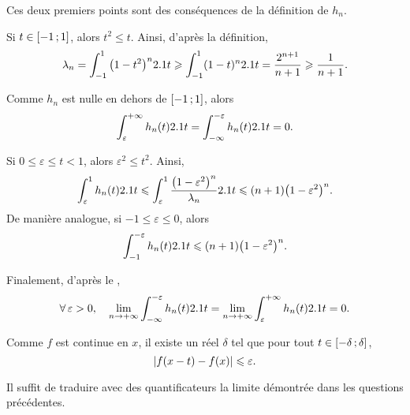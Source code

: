 \begin{solution}
\begin{reponses}
\item Ces deux premiers points sont des conséquences de la définition de $h_n$.

\item Si $t \in \left[-1\,;1\right]$, alors $t^2 \leqslant t$. Ainsi, d'après la définition,
\[
\lambda_n
= \int_{-1}^1 \big(1 - t^2\big)^n 2.1 t
\geqslant \int_{-1}^1 (1 - t)^n 2.1 t
= \frac{2^{n+1}}{n + 1} \geqslant \frac{1}{n+1}.
\]


\item Comme $h_n$ est nulle en dehors de $\left[-1\,;1\right]$, alors 
\[
\int_\varepsilon^{+\infty} h_n(t) 2.1 t
= \int_{-\infty}^{-\varepsilon} h_n(t) 2.1 t
= 0.
\]

\item Si $0 \leqslant \varepsilon \leqslant t < 1$, alors $\varepsilon^2 \leqslant t^2$. Ainsi,
\[
\int_\varepsilon^1 h_n(t) 2.1 t
\leqslant
\int_\varepsilon^1 \frac{\big(1 - \varepsilon^2\big)^n}{\lambda_n} 2.1 t
\leqslant
(n + 1) \big(1 - \varepsilon^2\big)^n.
\]
De manière analogue, si $-1 \leqslant \varepsilon \leqslant 0$, alors
\[
\int_{-1}^{-\varepsilon} h_n(t) 2.1 t \leqslant (n + 1) \big(1 - \varepsilon^2\big)^n.
\]

\item Finalement, d'après le ,
\[
\forall \varepsilon > 0,\quad
\displaystyle\lim_{n\to+\infty} \int_{-\infty}^{-\varepsilon} h_n(t) \d t
= \displaystyle\lim_{n\to+\infty} \int_{\varepsilon}^{+\infty} h_n(t) \d t
= 0.
\]

\item Comme $f$ est continue en $x$, il existe un réel $\delta$ tel que pour tout $t \in \left[-\delta\,;\delta\right]$,
\[
\mathopen{}\left| f(x - t) - f(x) \right| \leqslant \varepsilon.
\]

\item Il suffit de traduire avec des quantificateurs la limite démontrée dans les questions précédentes.


\end{reponses}
\end{solution}
